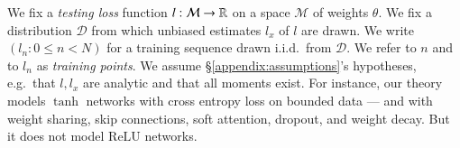 \documentclass[final,12pt]{colt2021} %
\newcommand{\Dd}{\mathcal{D}}
\newcommand{\Mm}{\mathcal{M}}
\begin{document}
            We fix a \emph{testing loss} function $l:\Mm\to\RR$ on a space
            $\Mm$ of weights $\theta$.  We fix a distribution $\Dd$ from which
            unbiased estimates $l_x$ of $l$ are drawn.  We write $(l_n: 0\leq
            n<N)$ for a training sequence drawn i.i.d.\ from $\Dd$.  We refer
            to $n$ and to $l_n$ as \emph{training points}.  We assume
            \S\ref{appendix:assumptions}'s hypotheses, e.g.\ that $l, l_x$ are
            analytic and that all moments exist.
            For instance, our theory models $\tanh$ networks with cross entropy
            loss on bounded data --- and with weight sharing, skip connections,
            soft attention, dropout, and weight decay.  But it does not model
            $\text{ReLU}$ networks.

\end{document}

